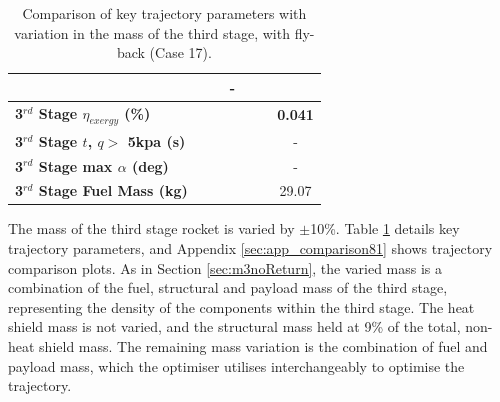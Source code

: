\begin{table}[ht]
\begin{tabular}{l c c c c c c}
		& \returnFuelmThreeOneHundredFive
		& \returnFuelmThreeOneHundredTen
		& -
		\\
		\hline 
		\textbf{3$^{rd}$ Stage $\eta_{exergy}$ (\%)}
		& \textbf{\thirddExergyEffmThreeNinety}
		& \textbf{\thirddExergyEffmThreeNinetyFive}
		& \textbf{\thirddExergyEffmThreeStandard}
		& \textbf{\thirddExergyEffmThreeOneHundredFive}
		& \textbf{\thirddExergyEffmThreeOneHundredTen}
		& \textbf{0.041}
		\\
		\textbf{3$^{rd}$ Stage $t$, $q >$ 5kpa (s)}
		& \thirdqOverFivemThreeNinety
		& \thirdqOverFivemThreeNinetyFive
		& \thirdqOverFivemThreeStandard
		& \thirdqOverFivemThreeOneHundredFive
		& \thirdqOverFivemThreeOneHundredTen
		& -
		\\
		\textbf{3$^{rd}$ Stage max $\alpha$ (deg)}
		& \thirdmaxAoAmThreeNinety
		& \thirdmaxAoAmThreeNinetyFive
		& \thirdmaxAoAmThreeStandard
		& \thirdmaxAoAmThreeOneHundredFive
		& \thirdmaxAoAmThreeOneHundredTen
		& -
		\\
		\textbf{3$^{rd}$ Stage Fuel Mass (kg)}
		& \thirdmFuelmThreeNinety
		& \thirdmFuelmThreeNinetyFive
		& \thirdmFuelmThreeStandard
		& \thirdmFuelmThreeOneHundredFive
		& \thirdmFuelmThreeOneHundredTen
		&29.07
		\\
		\hline 
	\end{tabular} 
	\caption{Comparison of key trajectory parameters with variation in the mass of the third stage, with fly-back (Case 17).}
	\label{tab:comparison81}
\end{table}

The mass of the third stage rocket is varied by $\pm$10\%. Table \ref{tab:comparison81} details key trajectory parameters, and Appendix \ref{sec:app_comparison81} shows trajectory comparison plots. As in Section \ref{sec:m3noReturn}, the varied mass is a combination of the fuel, structural and payload mass of the third stage, representing the density of the components within the third stage. The heat shield mass is not varied, and the structural mass held at 9\% of the total, non-heat shield mass. The remaining mass variation is the combination of fuel and payload mass, which the optimiser utilises interchangeably to optimise the trajectory.

